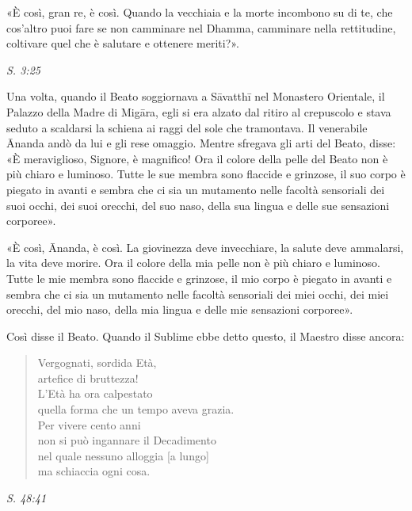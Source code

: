 «È così, gran re, è così. Quando la vecchiaia e la morte incombono su di
te, che cos’altro puoi fare se non camminare nel Dhamma, camminare nella
rettitudine, coltivare quel che è salutare e ottenere meriti?».


\emph{S. 3:25}


Una volta, quando il Beato soggiornava a Sāvatthī nel Monastero
Orientale, il Palazzo della Madre di Migāra, egli si era alzato dal
ritiro al crepuscolo e stava seduto a scaldarsi la schiena ai raggi del
sole che tramontava. Il venerabile Ānanda andò da lui e gli rese
omaggio. Mentre sfregava gli arti del Beato, disse: «È meraviglioso,
Signore, è magnifico! Ora il colore della pelle del Beato non è più
chiaro e luminoso. Tutte le sue membra sono flaccide e grinzose, il suo
corpo è piegato in avanti e sembra che ci sia un mutamento nelle facoltà
sensoriali dei suoi occhi, dei suoi orecchi, del suo naso, della sua
lingua e delle sue sensazioni corporee».


«È così, Ānanda, è così. La giovinezza deve invecchiare, la salute deve
ammalarsi, la vita deve morire. Ora il colore della mia pelle non è più
chiaro e luminoso. Tutte le mie membra sono flaccide e grinzose, il mio
corpo è piegato in avanti e sembra che ci sia un mutamento nelle facoltà
sensoriali dei miei occhi, dei miei orecchi, del mio naso, della mia
lingua e delle mie sensazioni corporee».


Così disse il Beato. Quando il Sublime ebbe detto questo, il Maestro
disse ancora:


\begin{quote}
Vergognati, sordida Età, \\
artefice di bruttezza! \\
L’Età ha ora calpestato \\
quella forma che un tempo aveva grazia. \\
Per vivere cento anni \\
non si può ingannare il Decadimento \\
nel quale nessuno alloggia [a lungo] \\
ma schiaccia ogni cosa.
\end{quote}

\emph{S. 48:41}


